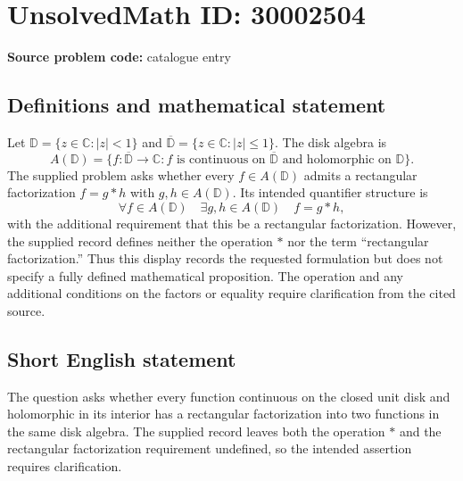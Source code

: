 \documentclass[11pt]{article}
\newcommand{\C}{\mathbb{C}}
\begin{document}
\section*{UnsolvedMath ID: 30002504}
\textbf{Source problem code:} catalogue entry
\subsection{Definitions and mathematical statement}
Let \(\mathbb D=\{z\in\C:|z|<1\}\) and \(\overline{\mathbb D}=\{z\in\C:|z|\leq1\}\). The disk algebra is
\[
A(\mathbb D)=\{f:\overline{\mathbb D}\to\C: f\text{ is continuous on }\overline{\mathbb D}\text{ and holomorphic on }\mathbb D\}.
\]
The supplied problem asks whether every \(f\in A(\mathbb D)\) admits a rectangular factorization \(f=g*h\) with \(g,h\in A(\mathbb D)\). Its intended quantifier structure is
\[
\forall f\in A(\mathbb D)\quad\exists g,h\in A(\mathbb D)\quad f=g*h,
\]
with the additional requirement that this be a rectangular factorization. However, the supplied record defines neither the operation \(*\) nor the term ``rectangular factorization.'' Thus this display records the requested formulation but does not specify a fully defined mathematical proposition. The operation and any additional conditions on the factors or equality require clarification from the cited source.
\subsection{Short English statement}
The question asks whether every function continuous on the closed unit disk and holomorphic in its interior has a rectangular factorization into two functions in the same disk algebra. The supplied record leaves both the operation \(*\) and the rectangular factorization requirement undefined, so the intended assertion requires clarification.
\end{document}

